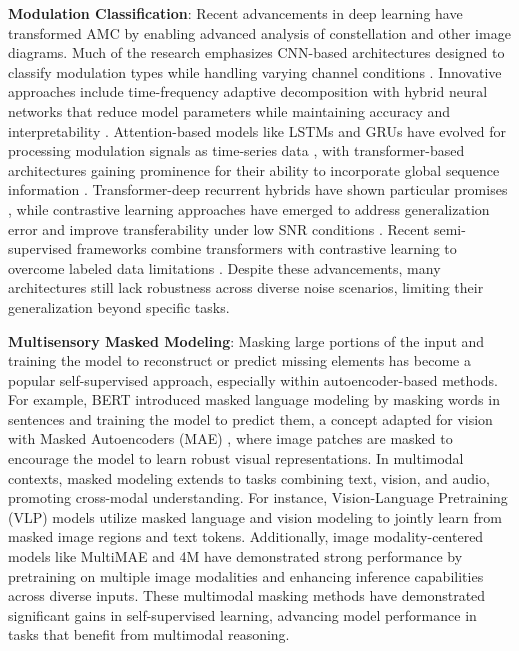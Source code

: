 \textbf{Modulation Classification}: Recent advancements in deep learning have transformed AMC by enabling advanced analysis of constellation and other image diagrams. Much of the research emphasizes CNN-based architectures designed to classify modulation types while handling varying channel conditions \cite{huynh2020mcnet}. Innovative approaches include time-frequency adaptive decomposition with hybrid neural networks that reduce model parameters while maintaining accuracy and interpretability \cite{10945334}. Attention-based models like LSTMs and GRUs have evolved for processing modulation signals as time-series data \cite{8446021, liu2021automatic}, with transformer-based architectures gaining prominence for their ability to incorporate global sequence information \cite{kong2023transformer}. Transformer-deep recurrent hybrids have shown particular promises \cite{10668824}, while contrastive learning approaches have emerged to address generalization error and improve transferability under low SNR conditions \cite{10857965}. Recent semi-supervised frameworks combine transformers with contrastive learning to overcome labeled data limitations \cite{10093837}. Despite these advancements, many architectures still lack robustness across diverse noise scenarios, limiting their generalization beyond specific tasks.

\textbf{Multisensory Masked Modeling}: Masking large portions of the input and training the model to reconstruct or predict missing elements has become a popular self-supervised approach, especially within autoencoder-based methods. For example, BERT \cite{devlin2018bert} introduced masked language modeling by masking words in sentences and training the model to predict them, a concept adapted for vision with Masked Autoencoders (MAE) \cite{he2022masked}, where image patches are masked to encourage the model to learn robust visual representations. In multimodal contexts, masked modeling extends to tasks combining text, vision, and audio, promoting cross-modal understanding. For instance, Vision-Language Pretraining (VLP) models \cite{wang2022image} utilize masked language and vision modeling to jointly learn from masked image regions and text tokens. Additionally, image modality-centered models like MultiMAE \cite{bachmann2022multimae} and 4M \cite{mizrahi20244m} have demonstrated strong performance by pretraining on multiple image modalities and enhancing inference capabilities across diverse inputs. These multimodal masking methods have demonstrated significant gains in self-supervised learning, advancing model performance in tasks that benefit from multimodal reasoning.

